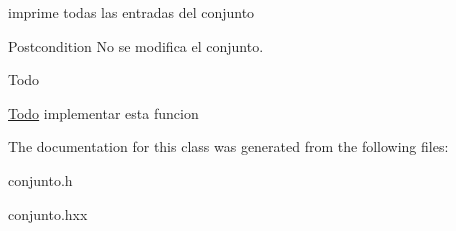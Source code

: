imprime todas las entradas del conjunto 

\begin{DoxyPostcond}{Postcondition}
No se modifica el conjunto. 
\end{DoxyPostcond}
\begin{DoxyRefDesc}{Todo}
\item[\hyperlink{todo__todo000002}{Todo}]implementar esta funcion \end{DoxyRefDesc}


The documentation for this class was generated from the following files\-:\begin{DoxyCompactItemize}
\item 
conjunto.\-h\item 
conjunto.\-hxx\end{DoxyCompactItemize}
